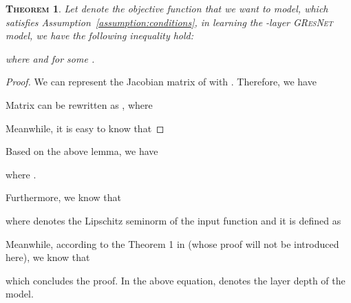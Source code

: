 \documentclass{article}
\newtheorem{appendix_theo}{\textsc{Theorem}}
\newcommand{\gresnet}{\textsc{GResNet}}
\begin{document}
\begin{appendix_theo}
Let  denote the objective function that we want to model, which satisfies Assumption~\ref{assumption:conditions}, in learning the -layer {\gresnet} model, we have the following inequality hold:

where  and  for some .
\end{appendix_theo}

\begin{proof}
We can represent the Jacobian matrix  of  with . Therefore, we have

Matrix  can be rewritten as , where


Meanwhile, it is easy to know that

\end{proof}

Based on the above lemma, we have

where .

Furthermore, we know that

where  denotes the Lipschitz seminorm of the input function and it is defined as


Meanwhile, according to the Theorem 1 in \cite{BEL18} (whose proof will not be introduced here), we know that 

which concludes the proof. In the above equation,  denotes the layer depth of the model.
\end{document}
